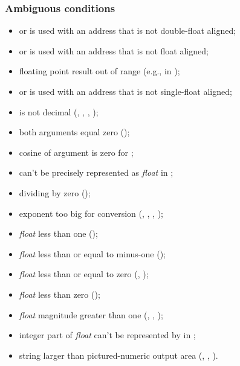 \subsubsection{Ambiguous conditions} %
\label{float:ambiguous}
\begin{itemize}
\item {} or  is used with an address that is not
	double-float aligned;
\item {} or  is used with an address that is not
	float aligned;
\item floating point result out of range
	(e.g., in );
\item {} or  is used with an address that is not
	single-float aligned;
\item {} is not decimal
	(,
	 ,
	 ,
	 );
\item both arguments equal zero ();
\item cosine of argument is zero for ;
\item {} can't be precisely represented as \emph{float} in
	;
\item dividing by zero ();
\item exponent too big for conversion
	(,
	 ,
	 ,
	 );
\item \emph{float} less than one ();
\item \emph{float} less than or equal to minus-one
	();
\item \emph{float} less than or equal to zero
	(,
	 );
\item \emph{float} less than zero
	();
\item \emph{float} magnitude greater than one
	(,
	 ,
	 );
\item integer part of \emph{float} can't be represented by  in
	;
\item string larger than pictured-numeric output area
	(,
	 ,
	 ).
\end{itemize}

